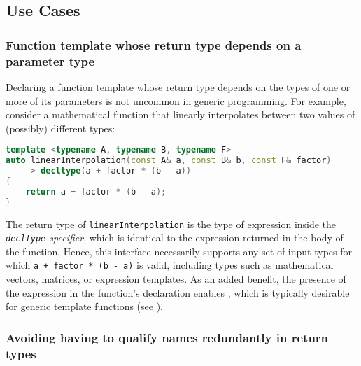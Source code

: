 \subsection[Use Cases]{Use Cases}\label{use-cases}

\subsubsection[Function template whose return type depends on a parameter type]{Function template whose return type depends on a parameter type}\label{function-template-whose-return-type-depends-on-a-parameter-type}

Declaring a function template whose return type depends on the types of
one or more of its parameters is not uncommon in generic programming.
For example, consider a mathematical function that linearly interpolates
between two values of (possibly) different types:

\begin{lstlisting}[language=C++]
template <typename A, typename B, typename F>
auto linearInterpolation(const A& a, const B& b, const F& factor)
    -> decltype(a + factor * (b - a))
{
    return a + factor * (b - a);
}
\end{lstlisting}
    
\noindent The return type of \lstinline!linearInterpolation! is the type of
expression inside the \emph{\lstinline!decltype! specifier}, which is
identical to the expression returned in the body of the function. Hence,
this interface necessarily supports any set of input types for which
\lstinline!a!~\lstinline!+!~\lstinline!factor!~\lstinline!*!~\lstinline!(b!~\lstinline!-!~\lstinline!a)!
is valid, including types such as mathematical vectors, matrices, or
expression templates. As an added benefit, the presence of the
expression in the function's declaration enables , which is typically desirable for generic template functions
(see %
).

\subsubsection[Avoiding having to qualify names redundantly in return types]{Avoiding having to qualify names redundantly in return types}\label{avoiding-having-to-qualify-names-redundantly-in-return-types}

